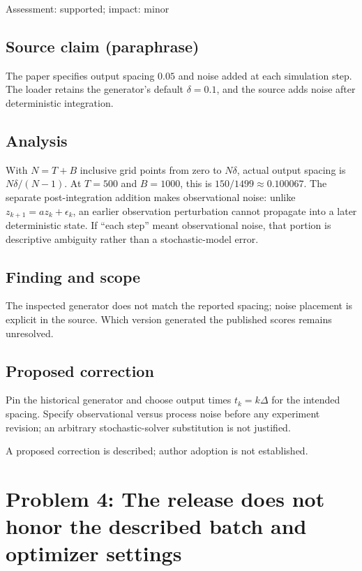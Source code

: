 \documentclass[11pt]{article}
\begin{document}
Assessment: supported; impact: minor

\subsection*{Source claim (paraphrase)}

The paper specifies output spacing \(0.05\) and noise added at each simulation step. The loader retains the generator’s default \(\delta=0.1\), and the source adds noise after deterministic integration.

\subsection*{Analysis}

With \(N=T+B\) inclusive grid points from zero to \(N\delta\), actual output spacing is \(N\delta/(N-1)\). At \(T=500\) and \(B=1000\), this is \(150/1499\approx0.100067\). The separate post-integration addition makes observational noise: unlike \(z_{k+1}=az_k+\epsilon_k\), an earlier observation perturbation cannot propagate into a later deterministic state. If “each step” meant observational noise, that portion is descriptive ambiguity rather than a stochastic-model error.

\subsection*{Finding and scope}

The inspected generator does not match the reported spacing; noise placement is explicit in the source. Which version generated the published scores remains unresolved.

\subsection*{Proposed correction}

Pin the historical generator and choose output times \(t_k=k\Delta\) for the intended spacing. Specify observational versus process noise before any experiment revision; an arbitrary stochastic-solver substitution is not justified.

A proposed correction is described; author adoption is not established.

\section*{Problem 4: The release does not honor the described batch and optimizer settings}
\end{document}
